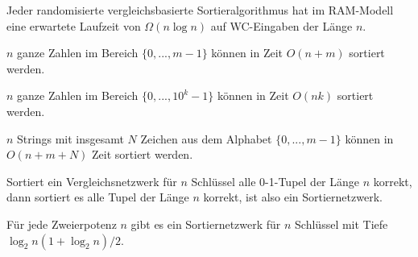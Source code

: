 \documentclass{cheat-sheet}
\begin{document}
\begin{satz}
  Jeder randomisierte vergleichsbasierte Sortieralgorithmus hat im RAM-Modell eine erwartete Laufzeit von $\Omega(n \log n)$ auf WC-Eingaben der Länge $n$.
\end{satz}



\fbox{
  \begin{minipage}{8.5cm}
    \hfill\vspace{2.5cm}
  \end{minipage}
}

\begin{satz}
  $n$ ganze Zahlen im Bereich $\{ 0, ..., m-1 \}$ können in Zeit $O(n+m)$ sortiert werden.
\end{satz}

\begin{satz}
  $n$ ganze Zahlen im Bereich $\{ 0, ..., 10^k-1 \}$ können in Zeit $O(nk)$ sortiert werden.
\end{satz}


\begin{satz}
  $n$ Strings mit insgesamt $N$ Zeichen aus dem Alphabet $\{ 0, ..., m-1 \}$ können in $O(n + m + N)$ Zeit sortiert werden.
\end{satz}


\begin{satz}[0-1-Prinzip]
  Sortiert ein Vergleichsnetzwerk für $n$ Schlüssel alle 0-1-Tupel der Länge $n$ korrekt, dann sortiert es alle Tupel der Länge $n$ korrekt, ist also ein Sortiernetzwerk.
\end{satz}

\begin{satz}
  Für jede Zweierpotenz $n$ gibt es ein Sortiernetzwerk für $n$ Schlüssel mit Tiefe $\log_2 n (1 + \log_2 n) / 2$.
\end{satz}




\end{document}
